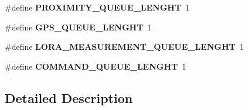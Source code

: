 \begin{DoxyCompactItemize}
\item 
\hypertarget{group___queue_gaa2c8a5464870845aaa54ed9115953945}{}\#define {\bfseries P\+R\+O\+X\+I\+M\+I\+T\+Y\+\_\+\+Q\+U\+E\+U\+E\+\_\+\+L\+E\+N\+G\+H\+T}~1\label{group___queue_gaa2c8a5464870845aaa54ed9115953945}

\item 
\hypertarget{group___queue_ga2a0f9dd2eda00c3e76b5cef3474b69b5}{}\#define {\bfseries G\+P\+S\+\_\+\+Q\+U\+E\+U\+E\+\_\+\+L\+E\+N\+G\+H\+T}~1\label{group___queue_ga2a0f9dd2eda00c3e76b5cef3474b69b5}

\item 
\hypertarget{group___queue_gac96fcf94a8619edc7c79e155cd3fb401}{}\#define {\bfseries L\+O\+R\+A\+\_\+\+M\+E\+A\+S\+U\+R\+E\+M\+E\+N\+T\+\_\+\+Q\+U\+E\+U\+E\+\_\+\+L\+E\+N\+G\+H\+T}~1\label{group___queue_gac96fcf94a8619edc7c79e155cd3fb401}

\item 
\hypertarget{group___queue_gad6c240917a2c741b51cd110f50f586bc}{}\#define {\bfseries C\+O\+M\+M\+A\+N\+D\+\_\+\+Q\+U\+E\+U\+E\+\_\+\+L\+E\+N\+G\+H\+T}~1\label{group___queue_gad6c240917a2c741b51cd110f50f586bc}

\end{DoxyCompactItemize}


\subsection{Detailed Description}
